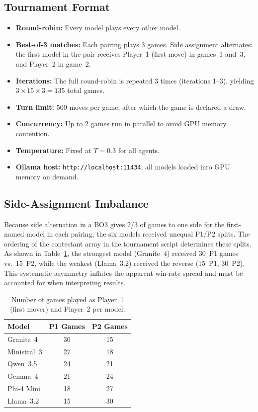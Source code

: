 \documentclass[11pt]{article}
\begin{document}
\subsection{Tournament Format}

\begin{itemize}[nosep]
\item \textbf{Round-robin:} Every model plays every other model.
\item \textbf{Best-of-3 matches:} Each pairing plays 3 games. Side assignment alternates: the first model in the pair receives Player~1 (first move) in games~1 and~3, and Player~2 in game~2.
\item \textbf{Iterations:} The full round-robin is repeated 3 times (iterations 1--3), yielding $3 \times 15 \times 3 = 135$ total games.
\item \textbf{Turn limit:} 500 moves per game, after which the game is declared a draw.
\item \textbf{Concurrency:} Up to 2 games run in parallel to avoid GPU memory contention.
\item \textbf{Temperature:} Fixed at $T = 0.3$ for all agents.
\item \textbf{Ollama host:} \texttt{http://localhost:11434}, all models loaded into GPU memory on demand.
\end{itemize}

\subsection{Side-Assignment Imbalance}

Because side alternation in a BO3 gives 2/3 of games to one side for the first-named model in each pairing, the six models received unequal P1/P2 splits. The ordering of the contestant array in the tournament script determines these splits. As shown in Table~\ref{tab:side_split}, the strongest model (Granite~4) received 30~P1 games vs.\ 15~P2, while the weakest (Llama~3.2) received the reverse (15~P1, 30~P2). This systematic asymmetry inflates the apparent win-rate spread and must be accounted for when interpreting results.

\begin{table}[H]
\centering
\caption{Number of games played as Player~1 (first mover) and Player~2 per model.}
\label{tab:side_split}
\begin{tabular}{lcc}
\toprule
\textbf{Model} & \textbf{P1 Games} & \textbf{P2 Games} \\
\midrule
Granite~4   & 30 & 15 \\
Ministral~3 & 27 & 18 \\
Qwen~3.5    & 24 & 21 \\
Gemma~4     & 21 & 24 \\
Phi-4 Mini  & 18 & 27 \\
Llama~3.2   & 15 & 30 \\
\bottomrule
\end{tabular}
\end{table}
\end{document}
